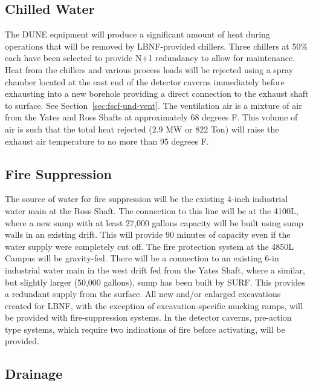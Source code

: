 \subsection{Chilled Water}
\label{sec:fscf-und-ch-h2o}

The DUNE equipment will produce a significant amount of heat during operations that will be removed by LBNF-provided chillers. Three chillers at 50\%  each  have been selected to provide N+1 redundancy to allow for maintenance. Heat from the chillers and various process loads will be rejected using a spray chamber located at the east end of the detector caverns immediately before exhausting into a new borehole providing a direct connection to the exhaust shaft to surface. See Section~\ref{sec:fscf-und-vent}.  The ventilation air is a mixture of air from the Yates and Ross Shafts at approximately 68 degrees F. This volume of air is such that the total heat rejected (2.9 MW or 822 Ton) will raise the exhaust air temperature to no more than 95 degrees F. 



\subsection{Fire Suppression}
\label{sec:fscf-und-fire-supp}

The source of water for fire suppression will be the existing 4-inch industrial water main at the Ross Shaft. The connection to this line will be at the 4100L, where a new sump with at least 27,000 gallons capacity will be built using sump walls in an existing drift. This will provide 90 minutes of capacity even if the water supply were completely cut off.  The fire protection system at the 4850L Campus will be gravity-fed. There will be a connection to an existing 6-in industrial water main in the west drift fed from the Yates Shaft, where a similar, but slightly larger (50,000 gallons), sump has been built by SURF. This provides a redundant supply from the surface.  All new and/or enlarged excavations created for LBNF, with the exception of excavation-specific mucking ramps, will be provided with fire-suppression systems.  In the detector caverns, pre-action type systems, which require two indications of fire before activating, will be provided.


\subsection{Drainage}
\label{sec:fscf-und-drain}

